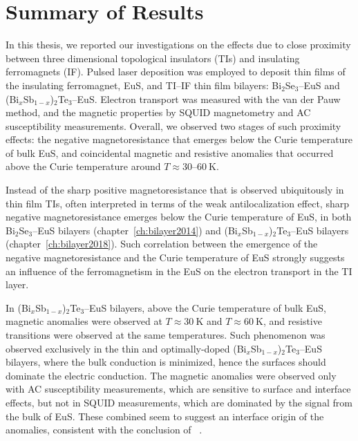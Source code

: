 \section{Summary of Results}
In this thesis, we reported our investigations on the effects due to close proximity between three dimensional topological insulators (TIs) and insulating ferromagnets (IF). Pulsed laser deposition was employed to deposit thin films of the insulating ferromagnet, EuS, and TI--IF thin film bilayers: Bi$_2$Se$_3$--EuS and (Bi$_x$Sb$_{1-x}$)$_2$Te$_3$--EuS. Electron transport was measured with the van der Pauw method, and the magnetic properties by SQUID magnetometry and AC susceptibility measurements. Overall, we observed two stages of such proximity effects: the negative magnetoresistance that emerges below the Curie temperature of bulk EuS, and coincidental magnetic and resistive anomalies that occurred above the Curie temperature around $T\approx30$--$60~\mathrm{K}$.

Instead of the sharp positive magnetoresistance that is observed ubiquitously in thin film TIs, often interpreted in terms of the weak antilocalization effect, sharp negative magnetoresistance emerges below the Curie temperature of EuS, in both Bi$_2$Se$_3$--EuS bilayers (chapter~\ref{ch:bilayer2014}) and (Bi$_x$Sb$_{1-x}$)$_2$Te$_3$--EuS bilayers (chapter~\ref{ch:bilayer2018}). Such correlation between the emergence of the negative magnetoresistance and the Curie temperature of EuS strongly suggests an influence of the ferromagnetism in the EuS on the electron transport in the TI layer.

In (Bi$_x$Sb$_{1-x}$)$_2$Te$_3$--EuS bilayers, above the Curie temperature of bulk EuS, magnetic anomalies were observed at $T\approx30~\mathrm{K}$ and $T\approx60~\mathrm{K}$, and resistive transitions were observed at the same temperatures. Such phenomenon was observed exclusively in the thin and optimally-doped (Bi$_x$Sb$_{1-x}$)$_2$Te$_3$--EuS bilayers, where the bulk conduction is minimized, hence the surfaces should dominate the electric conduction. The magnetic anomalies were observed only with AC susceptibility measurements, which are sensitive to surface and interface effects, but not in SQUID measurements, which are dominated by the signal from the bulk of EuS. These combined seem to suggest an interface origin of the anomalies, consistent with the conclusion of \citeauthor{Moodera2016}~\cite{Moodera2016}.

